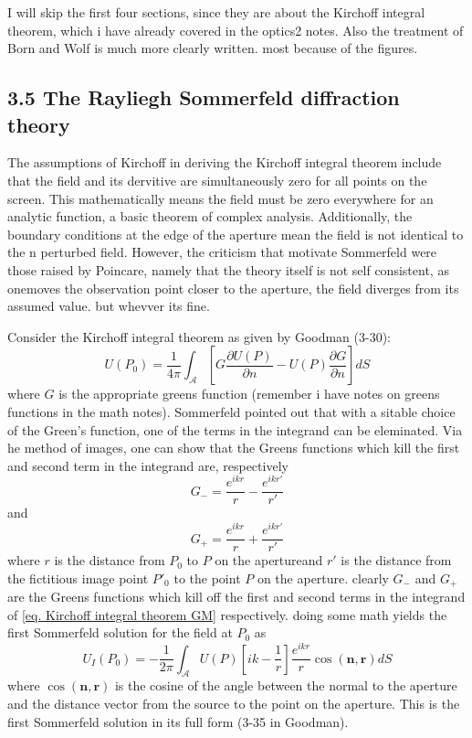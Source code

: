 \documentclass[../../main.tex]{subfiles}
\begin{document}
I will skip the first four sections, since they are about the Kirchoff integral theorem, which i have already covered in the optics2 notes. Also the treatment of Born and Wolf is much more clearly written. most because of the figures. 
\subsection{3.5 The Rayliegh Sommerfeld diffraction theory}
The assumptions of Kirchoff in deriving the Kirchoff integral theorem include that the field and its dervitive are simultaneously zero for all points on the screen. This mathematically means the field must be zero everywhere for an analytic function, a basic theorem of complex analysis. Additionally, the boundary conditions at the edge of the aperture mean the field is not identical to the n perturbed field. However, the criticism that motivate Sommerfeld were those raised by Poincare, namely that the theory itself is not self consistent, as onemoves the observation point closer to the aperture, the field diverges from its assumed value. but whevver its fine.

Consider the Kirchoff integral theorem as given by Goodman (3-30):
\begin{equation}\label{eq. Kirchoff integral theorem GM}
    U(P_0)=\frac{1}{4\pi}\int_{\mathcal{A}}\left[G\frac{\partial U(P)}{\partial n}-U(P)\frac{\partial G}{\partial n}\right]dS
\end{equation}
where $G$ is the appropriate greens function (remember i have notes on greens functions in the math notes). Sommerfeld pointed out that with a sitable choice of the Green's function, one of the terms in the integrand can be eleminated. Via he method of images, one can show that the Greens functions which kill the first and second term in the integrand are, respectively
\begin{equation}\label{eq. Greens function minus}
    G_-=\frac{e^{ikr}}{r}-\frac{e^{ikr'}}{r'}
\end{equation}
and
\begin{equation}\label{eq. Greens function plus}
    G_+=\frac{e^{ikr}}{r}+\frac{e^{ikr'}}{r'}
\end{equation}
where $r$ is the distance from $P_0$ to $P$ on the apertureand $r'$ is the distance from the fictitious image point $P'_0$ to the point $P$ on the aperture. clearly $G_-$ and $G_+$ are the Greens functions which kill off the first and second terms in the integrand of \ref{eq. Kirchoff integral theorem GM} respectively. doing some math yields the first Sommerfeld solution for the field at $P_0$ as
\begin{equation}\label{eq. Sommerfeld solution 1}
    U_I(P_0)=-\frac{1}{2\pi}\int_{\mathcal{A}}U(P)\left[ik-\frac{1}{r}\right]\frac{e^{ikr}}{r}\cos(\mathbf{n},\mathbf{r})dS
\end{equation}
where $\cos(\mathbf{n},\mathbf{r})$ is the cosine of the angle between the normal to the aperture and the distance vector from the source to the point on the aperture. This is the first Sommerfeld solution in its full form (3-35 in Goodman).
\end{document}

